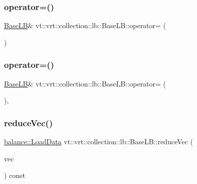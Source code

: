 \subsubsection{\texorpdfstring{operator=()}{operator=()}\hspace{0.1cm}{\footnotesize\ttfamily [1/2]}}
{\footnotesize\ttfamily \hyperlink{structvt_1_1vrt_1_1collection_1_1lb_1_1_base_l_b}{Base\+LB}\& vt\+::vrt\+::collection\+::lb\+::\+Base\+L\+B\+::operator= (\begin{DoxyParamCaption}\item[{\hyperlink{structvt_1_1vrt_1_1collection_1_1lb_1_1_base_l_b}{Base\+LB} const \&}]{ }\end{DoxyParamCaption})\hspace{0.3cm}{\ttfamily [delete]}}

\mbox{\label{structvt_1_1vrt_1_1collection_1_1lb_1_1_base_l_b_a1e092a34c8e4eda0a05ab3a2f5a9ae45}} 
\subsubsection{\texorpdfstring{operator=()}{operator=()}\hspace{0.1cm}{\footnotesize\ttfamily [2/2]}}
{\footnotesize\ttfamily \hyperlink{structvt_1_1vrt_1_1collection_1_1lb_1_1_base_l_b}{Base\+LB}\& vt\+::vrt\+::collection\+::lb\+::\+Base\+L\+B\+::operator= (\begin{DoxyParamCaption}\item[{\hyperlink{structvt_1_1vrt_1_1collection_1_1lb_1_1_base_l_b}{Base\+LB} \&\&}]{ }\end{DoxyParamCaption})\hspace{0.3cm}{\ttfamily [default]}, {\ttfamily [noexcept]}}

\mbox{\label{structvt_1_1vrt_1_1collection_1_1lb_1_1_base_l_b_aa88f0500376340c2b83d35fb03f0ba9e}} 
\subsubsection{\texorpdfstring{reduce\+Vec()}{reduceVec()}}
{\footnotesize\ttfamily \hyperlink{structvt_1_1vrt_1_1collection_1_1balance_1_1_load_data}{balance\+::\+Load\+Data} vt\+::vrt\+::collection\+::lb\+::\+Base\+L\+B\+::reduce\+Vec (\begin{DoxyParamCaption}\item[{std\+::vector$<$ \hyperlink{structvt_1_1vrt_1_1collection_1_1balance_1_1_load_data}{balance\+::\+Load\+Data} $>$ \&\&}]{vec }\end{DoxyParamCaption}) const\hspace{0.3cm}{\ttfamily [protected]}}

